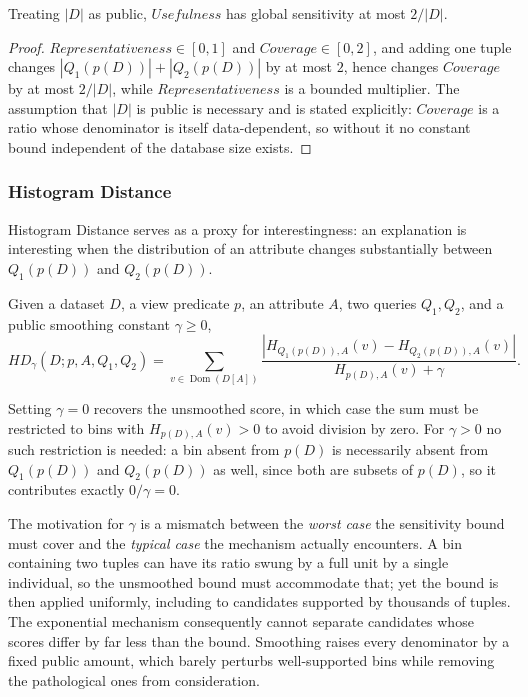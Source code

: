\begin{proposition}
\label{prop:usefulness-sensitivity}
Treating $|D|$ as public, $Usefulness$ has global sensitivity at most $2/|D|$.
\end{proposition}

\begin{proof}
$Representativeness\in[0,1]$ and $Coverage\in[0,2]$, and adding one tuple changes $|Q_1(p(D))|+|Q_2(p(D))|$ by at most $2$, hence changes $Coverage$ by at most $2/|D|$, while $Representativeness$ is a bounded multiplier.
The assumption that $|D|$ is public is necessary and is stated explicitly: $Coverage$ is a ratio whose denominator is itself data-dependent, so without it no constant bound independent of the database size exists.
\end{proof}

\subsubsection{Histogram Distance}
\label{subsubsec:histogram-distance}

Histogram Distance serves as a proxy for interestingness: an explanation is interesting when the distribution of an attribute changes substantially between $Q_1(p(D))$ and $Q_2(p(D))$.

\begin{definition}
\label{def:hd}
Given a dataset $D$, a view predicate $p$, an attribute $A$, two queries $Q_1,Q_2$, and a public smoothing constant $\gamma \ge 0$,
\begin{equation}
HD_\gamma(D;p,A,Q_1,Q_2)
=\!\!\sum_{v\in \operatorname{Dom}(D[A])}\!\!
\frac{\left|H_{Q_1(p(D)),A}(v)-H_{Q_2(p(D)),A}(v)\right|}{H_{p(D),A}(v)+\gamma}.
\label{eq:hd-definition}
\end{equation}
\end{definition}

Setting $\gamma=0$ recovers the unsmoothed score, in which case the sum must be restricted to bins with $H_{p(D),A}(v)>0$ to avoid division by zero.
For $\gamma>0$ no such restriction is needed: a bin absent from $p(D)$ is necessarily absent from $Q_1(p(D))$ and $Q_2(p(D))$ as well, since both are subsets of $p(D)$, so it contributes exactly $0/\gamma=0$.

The motivation for $\gamma$ is a mismatch between the \emph{worst case} the sensitivity bound must cover and the \emph{typical case} the mechanism actually encounters.
A bin containing two tuples can have its ratio swung by a full unit by a single individual, so the unsmoothed bound must accommodate that; yet the bound is then applied uniformly, including to candidates supported by thousands of tuples.
The exponential mechanism consequently cannot separate candidates whose scores differ by far less than the bound.
Smoothing raises every denominator by a fixed public amount, which barely perturbs well-supported bins while removing the pathological ones from consideration.

